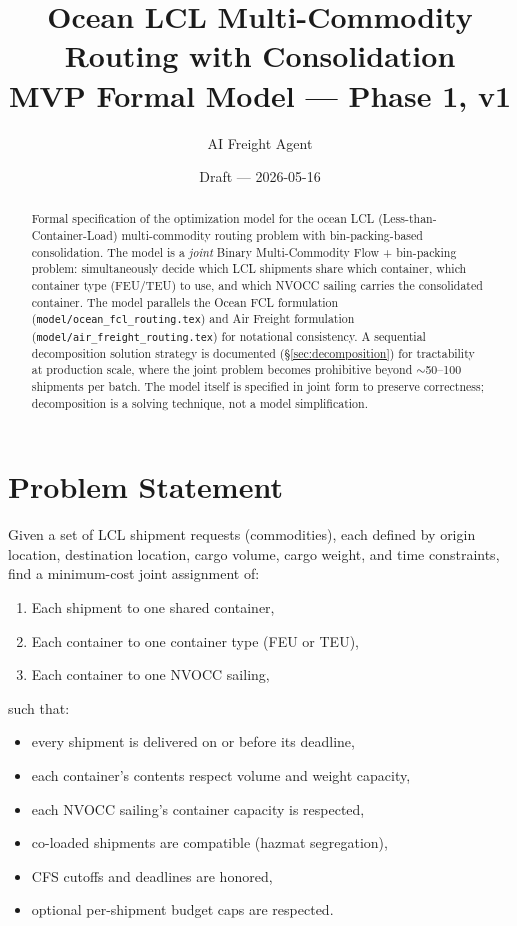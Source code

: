 \documentclass[11pt,a4paper]{article}
\title{\textbf{Ocean LCL Multi-Commodity Routing with Consolidation}\\[0.4em]
\large MVP Formal Model --- Phase 1, v1}
\author{AI Freight Agent}
\date{Draft --- 2026-05-16}
\theoremstyle{definition}
\begin{document}
\maketitle

\begin{abstract}
Formal specification of the optimization model for the ocean LCL (Less-than-Container-Load)
multi-commodity routing problem with bin-packing-based consolidation. The model is a
\emph{joint} Binary Multi-Commodity Flow + bin-packing problem: simultaneously decide which
LCL shipments share which container, which container type (FEU/TEU) to use, and which NVOCC
sailing carries the consolidated container. The model parallels the Ocean FCL formulation
(\texttt{model/ocean\_fcl\_routing.tex}) and Air Freight formulation
(\texttt{model/air\_freight\_routing.tex}) for notational consistency. A sequential
decomposition solution strategy is documented (\S\ref{sec:decomposition}) for tractability
at production scale, where the joint problem becomes prohibitive beyond
$\sim$50--100 shipments per batch. The model itself is specified in joint form to preserve
correctness; decomposition is a solving technique, not a model simplification.
\end{abstract}

\tableofcontents
\newpage

\section{Problem Statement}

Given a set of LCL shipment requests (commodities), each defined by origin location,
destination location, cargo volume, cargo weight, and time constraints, find a minimum-cost
joint assignment of:
\begin{enumerate}[noitemsep]
  \item Each shipment to one shared container,
  \item Each container to one container type (FEU or TEU),
  \item Each container to one NVOCC sailing,
\end{enumerate}
such that:
\begin{itemize}[noitemsep]
  \item every shipment is delivered on or before its deadline,
  \item each container's contents respect volume and weight capacity,
  \item each NVOCC sailing's container capacity is respected,
  \item co-loaded shipments are compatible (hazmat segregation),
  \item CFS cutoffs and deadlines are honored,
  \item optional per-shipment budget caps are respected.
\end{itemize}
\end{document}

